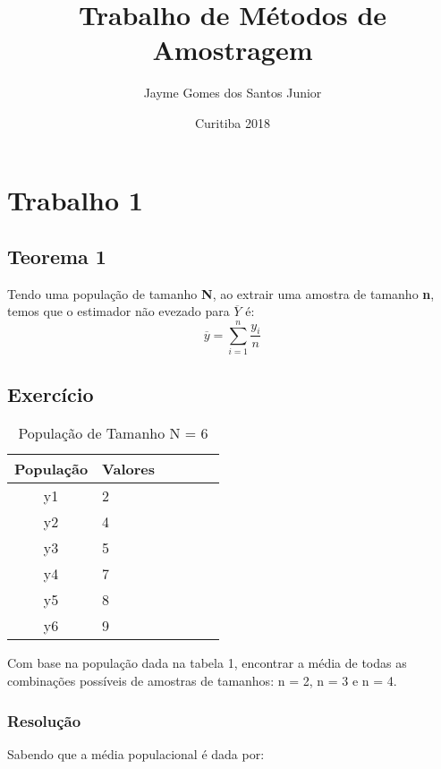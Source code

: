 \documentclass[]{article}
\title{Trabalho de Métodos de Amostragem}
\author{Jayme Gomes dos Santos Junior}
\date{Curitiba 2018}
\begin{document}
\maketitle

{
\setcounter{tocdepth}{2}
\tableofcontents
}
\newpage

\section{Trabalho 1}\label{trabalho-1}

\subsection{Teorema 1}\label{teorema-1}

Tendo uma população de tamanho \textbf{N}, ao extrair uma amostra de
tamanho \textbf{n}, temos que o estimador não evezado para
\(\overline{Y}\) é: \[
\overline{y} = \sum_{i=1}^n\dfrac{y_i}{n}
\]

\subsection{Exercício}\label{exercicio}

\begin{table}

\caption{\label{tab:unnamed-chunk-1}População de Tamanho N = 6}
\centering
\begin{tabular}[t]{clc|clc}
\hline
População & Valores\\
\hline
y1 & 2\\
\hline
y2 & 4\\
\hline
y3 & 5\\
\hline
y4 & 7\\
\hline
y5 & 8\\
\hline
y6 & 9\\
\hline
\end{tabular}
\end{table}

\newpage

Com base na população dada na tabela 1, encontrar a média de todas as
combinações possíveis de amostras de tamanhos: n = 2, n = 3 e n = 4.

\subsubsection{Resolução}\label{resolucao}

Sabendo que a média populacional é dada por:
\end{document}
